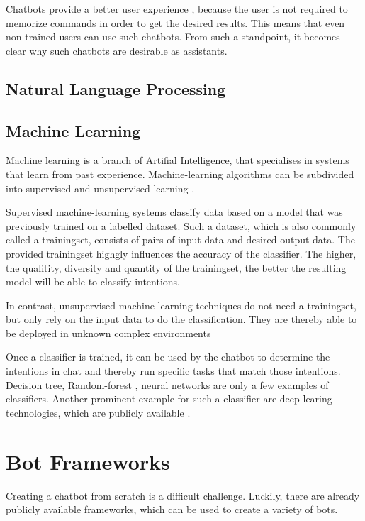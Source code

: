 Chatbots provide a better user experience \cite{CHW*17}, because the user is not required to memorize commands in order to get the desired results. This means that even non-trained users can use such chatbots. From such a standpoint, it becomes clear why such chatbots are desirable as assistants.

\subsection{Natural Language Processing}


\subsection{Machine Learning}
Machine learning is a branch of Artifial Intelligence, that specialises in systems that learn from past experience. Machine-learning algorithms can be subdivided into supervised and unsupervised learning \cite{MiBu16}.

Supervised machine-learning systems classify data based on a model that was previously trained on a labelled dataset. Such a dataset, which is also commonly called a trainingset, consists of pairs of input data and desired output data. The provided trainingset highgly influences the accuracy of the classifier. The higher, the qualitity, diversity and quantity of the trainingset, the better the resulting model will be able to classify intentions.

In contrast, unsupervised machine-learning techniques do not need a trainingset, but only rely on the input data to do the classification.
They are thereby able to be deployed in unknown complex environments \cite{Adam17}

Once a classifier is trained, it can be used by the chatbot to determine the intentions in chat and thereby run specific tasks that match those intentions.
Decision tree, Random-forest , neural networks are only a few examples of classifiers. Another prominent example for such a classifier are deep learing technologies, which are publicly available \cite{NLKl19}.

\section{Bot Frameworks}
Creating a chatbot from scratch is a difficult challenge. Luckily, there are already publicly available frameworks, which can be used to create a variety of bots.

